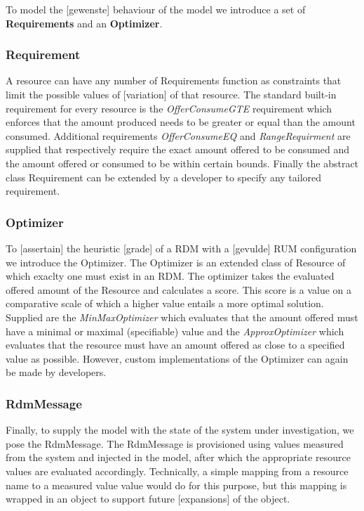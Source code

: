 To model the [gewenste] behaviour of the model we introduce a set of \textbf{Requirements} and an \textbf{Optimizer}.
\subsubsection{Requirement}
A resource can have any number of Requirements function as constraints that limit the possible values of [variation] of that resource. The standard built-in requirement for every resource is the \emph{OfferConsumeGTE} requirement which enforces that the amount produced needs to be greater or equal than the amount consumed. Additional requirements \emph{OfferConsumeEQ} and \emph{RangeRequirment} are supplied that respectively require the exact amount offered to be consumed and the amount offered or consumed to be within certain bounds. Finally the abstract class Requirement can be extended by a developer to specify any tailored requirement.
\subsubsection{Optimizer}
To [assertain] the heuristic [grade] of a RDM with a [gevulde] RUM configuration we introduce the Optimizer. The Optimizer is an extended class of Resource of which exaclty one must exist in an RDM. The optimizer takes the evaluated offered amount of the Resource and calculates a score. This score is a value on a comparative scale of which a higher value entails a more optimal solution. Supplied are the \emph{MinMaxOptimizer} which evaluates that the amount offered must have a minimal or maximal (specifiable) value and the \emph{ApproxOptimizer} which evaluates that the resource must have an amount offered as close to a specified value as possible. However, custom implementations of the Optimizer can again be made by developers.

\subsubsection{RdmMessage}
Finally, to supply the model with the state of the system under investigation, we pose the RdmMessage. The RdmMessage is provisioned using values measured from the system and injected in the model, after which the appropriate resource values are evaluated accordingly. Technically, a simple mapping from a resource name to a measured value value would do for this purpose, but this mapping is wrapped in an object to support future [expansions] of the object.

